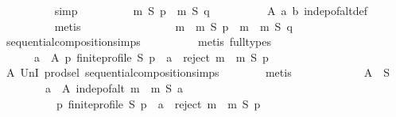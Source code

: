 \begin{isabellebody}
\ \ \ \ \ \ \ \ \isamarkupfalse%
\ simp\isanewline
\ \ \ \ \ \ \isamarkupfalse%
\ \isamarkupfalse%
\ {\isachardoublequoteopen}m\ S\ p\ {\isacharequal}{\kern0pt}\ m\ S\ q{\isachardoublequoteclose}\isanewline
\ \ \ \ \ \ \ \ \isamarkupfalse%
\ A\ a\ b\ indep{\isacharunderscore}{\kern0pt}of{\isacharunderscore}{\kern0pt}alt{\isacharunderscore}{\kern0pt}def\isanewline
\ \ \ \ \ \ \ \ \isamarkupfalse%
\ metis\isanewline
\ \ \ \ \ \ \isamarkupfalse%
\ \isamarkupfalse%
\isanewline
\ \ \ \ \ \ \ \ {\isachardoublequoteopen}{\isacharparenleft}{\kern0pt}m\ {\isasymtriangleright}\ m{}{\isacharparenright}{\kern0pt}\ S\ p\ {\isacharequal}{\kern0pt}\ {\isacharparenleft}{\kern0pt}m\ {\isasymtriangleright}\ m{}{\isacharparenright}{\kern0pt}\ S\ q{\isachardoublequoteclose}\isanewline
\ \ \ \ \ \ \ \ \isamarkupfalse%
\ sequential{\isacharunderscore}{\kern0pt}composition{\isachardot}{\kern0pt}simps\isanewline
\ \ \ \ \ \ \ \ \isamarkupfalse%
\ {\isacharparenleft}{\kern0pt}metis\ {\isacharparenleft}{\kern0pt}full{\isacharunderscore}{\kern0pt}types{\isacharparenright}{\kern0pt}{\isacharparenright}{\kern0pt}\isanewline
\ \ \ \ \isamarkupfalse%
\isanewline
\ \ \ \ \isamarkupfalse%
\ \isamarkupfalse%
\isanewline
\ \ \ \ \ \ {\isachardoublequoteopen}{\isasymforall}a\ {\isasymin}\ A{\isachardot}{\kern0pt}\ {\isasymforall}p{\isachardot}{\kern0pt}\ finite{\isacharunderscore}{\kern0pt}profile\ S\ p\ {\isasymlongrightarrow}\ a\ {\isasymin}\ reject\ {\isacharparenleft}{\kern0pt}m\ {\isasymtriangleright}\ m{}{\isacharparenright}{\kern0pt}\ S\ p{\isachardoublequoteclose}\isanewline
\ \ \ \ \ \ \isamarkupfalse%
\ A\ UnI{}\ prod{\isachardot}{\kern0pt}sel\ sequential{\isacharunderscore}{\kern0pt}composition{\isachardot}{\kern0pt}simps\isanewline
\ \ \ \ \ \ \isamarkupfalse%
\ metis\isanewline
\ \ \ \ \isamarkupfalse%
\ \isamarkupfalse%
\isanewline
\ \ \ \ \ \ {\isachardoublequoteopen}A\ {\isasymsubseteq}\ S\ {\isasymand}\isanewline
\ \ \ \ \ \ \ \ {\isacharparenleft}{\kern0pt}{\isasymforall}a\ {\isasymin}\ A{\isachardot}{\kern0pt}\ indep{\isacharunderscore}{\kern0pt}of{\isacharunderscore}{\kern0pt}alt\ {\isacharparenleft}{\kern0pt}m\ {\isasymtriangleright}\ m{}{\isacharparenright}{\kern0pt}\ S\ a\ {\isasymand}\isanewline
\ \ \ \ \ \ \ \ \ \ {\isacharparenleft}{\kern0pt}{\isasymforall}p{\isachardot}{\kern0pt}\ finite{\isacharunderscore}{\kern0pt}profile\ S\ p\ {\isasymlongrightarrow}\ a\ {\isasymin}\ reject\ {\isacharparenleft}{\kern0pt}m\ {\isasymtriangleright}\ m{}{\isacharparenright}{\kern0pt}\ S\ p{\isacharparenright}{\kern0pt}{\isacharparenright}{\kern0pt}\ {\isasymand}\isanewline

\end{isabellebody}
